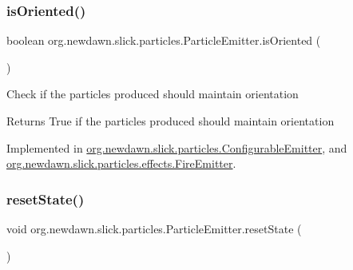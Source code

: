 \mbox{\label{interfaceorg_1_1newdawn_1_1slick_1_1particles_1_1_particle_emitter_a4a51564b4539a1eb2c3fc0d322ac5c2a}} 
\subsubsection{\texorpdfstring{is\+Oriented()}{isOriented()}}
{\footnotesize\ttfamily boolean org.\+newdawn.\+slick.\+particles.\+Particle\+Emitter.\+is\+Oriented (\begin{DoxyParamCaption}{ }\end{DoxyParamCaption})}

Check if the particles produced should maintain orientation

\begin{DoxyReturn}{Returns}
True if the particles produced should maintain orientation 
\end{DoxyReturn}


Implemented in \mbox{\hyperlink{classorg_1_1newdawn_1_1slick_1_1particles_1_1_configurable_emitter_a1435dc04f4e3a38ba5af82650ca3f9ea}{org.\+newdawn.\+slick.\+particles.\+Configurable\+Emitter}}, and \mbox{\hyperlink{classorg_1_1newdawn_1_1slick_1_1particles_1_1effects_1_1_fire_emitter_a192b97279748b97f24fce7e04b9fc90b}{org.\+newdawn.\+slick.\+particles.\+effects.\+Fire\+Emitter}}.

\mbox{\label{interfaceorg_1_1newdawn_1_1slick_1_1particles_1_1_particle_emitter_a1120925a31c61fc95dc38eca9b01b9ef}} 
\subsubsection{\texorpdfstring{reset\+State()}{resetState()}}
{\footnotesize\ttfamily void org.\+newdawn.\+slick.\+particles.\+Particle\+Emitter.\+reset\+State (\begin{DoxyParamCaption}{ }\end{DoxyParamCaption})}

